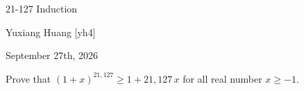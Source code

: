 \documentclass[11pt]{article}
\newif\ifSHOWSOLUTION
\newcommand{\showsolution}[1]{\par
  \ifSHOWSOLUTION
  \textbf{\textcolor{blue}{Solution.}} {\color{blue}#1}
  \fi
}
\begin{document}
\begin{center}
  {\LARGE 21-127 Induction

    \large Yuxiang Huang [yh4]

  September 27th, 2026}
\end{center}

Prove that $(1 + x)^{21{,}127} \geq 1 + 21{,}127\,x$ for all real number $x \geq -1$.

\newpage
\showsolution{
  We will prove that for all real $x \geq -1$ and any integer $n \geq 1$,
  $$(1+x)^n \geq 1 + n x$$

  Let $x \in \mathbb{R}$ such that $x \geq -1$. We proceed by induction on $n \geq 1$.

  \begin{itemize}
    \item \textbf{Base Case:} Let $n = 1$. Then
      $
      (1+x)^1 = 1 + x = 1 + 1 \cdot x,
      $
      so the inequality holds.
      \vspace{10pt}

    \item \textbf{Inductive Case:} Let $n \in \mathbb{Z}$ such that $n \geq 1$.

    \item \textbf{Inductive Hypothesis:} Assume that
      $(1+x)^n \geq 1 + n x$.

    \item \textbf{Inductive Step:} Consider $n+1$. Then
      $$
      (1+x)^{n+1} = (1+x)^n (1+x).
      $$
      Using the inductive hypothesis, we have
      $$
      (1+x)^{n+1} \geq (1 + n x)(1 + x) = 1 + (n+1)x + n x^2.
      $$
      Since $x^2 \geq 0$, it follows that
      $$
      (1+x)^{n+1} \geq 1 + (n+1)x.
      $$
  \end{itemize}

  By the Principle of Mathematical Induction, we conclude that for all integers $n \geq 1$
  $$
  (1+x)^n \geq 1 + n x
  $$
}
\end{document}

